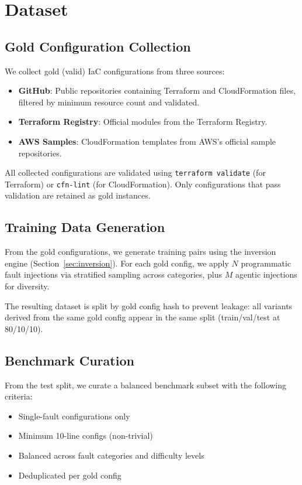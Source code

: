 \section{Dataset}
\label{sec:dataset}

\subsection{Gold Configuration Collection}
\label{sec:gold_collection}

We collect gold (valid) IaC configurations from three sources:
\begin{itemize}
    \item \textbf{GitHub}: Public repositories containing Terraform and CloudFormation files, filtered by minimum resource count and validated.
    \item \textbf{Terraform Registry}: Official modules from the Terraform Registry.
    \item \textbf{AWS Samples}: CloudFormation templates from AWS's official sample repositories.
\end{itemize}

All collected configurations are validated using \texttt{terraform validate} (for Terraform) or \texttt{cfn-lint} (for CloudFormation). Only configurations that pass validation are retained as gold instances.


\subsection{Training Data Generation}
\label{sec:training_data}

From the gold configurations, we generate training pairs using the inversion engine (Section~\ref{sec:inversion}). For each gold config, we apply $N$ programmatic fault injections via stratified sampling across categories, plus $M$ agentic injections for diversity.

The resulting dataset is split by gold config hash to prevent leakage: all variants derived from the same gold config appear in the same split (train/val/test at 80/10/10).


\subsection{Benchmark Curation}
\label{sec:benchmark}

From the test split, we curate a balanced benchmark subset with the following criteria:
\begin{itemize}
    \item Single-fault configurations only
    \item Minimum 10-line configs (non-trivial)
    \item Balanced across fault categories and difficulty levels
    \item Deduplicated per gold config
\end{itemize}

